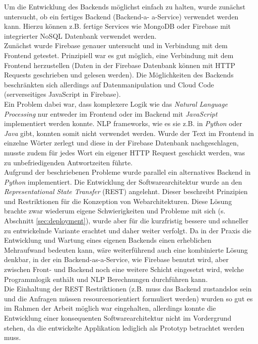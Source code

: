 Um die Entwicklung des Backends möglichst einfach zu halten, wurde zunächst untersucht, ob ein fertiges Backend (Backend-a- a-Service) verwendet werden kann. Hierzu können z.B. fertige Services wie MongoDB oder Firebase mit integrierter NoSQL Datenbank verwendet werden\cite{almootassem2017}.\\
Zunächst wurde Firebase genauer untersucht und in Verbindung mit dem Frontend getestet. Prinzipiell war es gut möglich, eine Verbindung mit dem Frontend herzustellen (Daten in der Firebase Datenbank können mit HTTP Requests geschrieben und gelesen werden). Die Möglichkeiten des Backends beschränkten sich allerdings auf Datenmanipulation und Cloud Code (serverseitiges JavaScript in Firebase).\\
Ein Problem dabei war, dass komplexere Logik wie das \textit{Natural Language Processing} nur entweder im Frontend oder im Backend mit \textit{JavaScript} implementiert werden konnte. NLP frameworks, wie es sie z.B. in \textit{Python} oder \textit{Java} gibt, konnten somit nicht verwendet werden. Wurde der Text im Frontend in einzelne Wörter zerlegt und diese in der Firebase Datenbank nachgeschlagen, musste zudem für jedes Wort ein eigener HTTP Request geschickt werden, was zu unbefriedigenden Antwortzeiten führte.\\

Aufgrund der beschriebenen Probleme wurde parallel ein alternatives Backend in \textit{Python} implementiert. Die Entwicklung der Softwarearchitektur wurde an den \textit{Representational State Transfer} (REST) angelehnt. Dieser beschreibt Prinzipien und Restriktionen für die Konzeption von Webarchitekturen\cite{Fielding:2000:ASD:932295}. Diese Lösung brachte zwar wiederum eigene Schwierigkeiten und Probleme mit sich (s. Abschnitt \ref{sec:deployment}), wurde aber für die kurzfristig bessere und schneller zu entwickelnde Variante erachtet und daher weiter verfolgt. Da in der Praxis die Entwicklung und Wartung eines eigenen Backends einen erheblichen Mehraufwand bedeuten kann, wäre weiterführend auch eine kombinierte Lösung denkbar, in der ein Backend-as-a-Service, wie Firebase benutzt wird, aber zwischen Front- und Backend noch eine weitere Schicht eingesetzt wird, welche Programmlogik enthält und NLP Berechnungen durchführen kann.\\

Die Einhaltung der REST Restriktionen (z.B. muss das Backend zustandslos sein und die Anfragen müssen resourcenorientiert formuliert werden) wurden so gut es im Rahmen der Arbeit möglich war eingehalten, allerdings konnte die Entwicklung einer konsequenten Softwarearchitektur nicht im Vordergrund stehen, da die entwickelte Applikation lediglich als Prototyp betrachtet werden muss.\\

